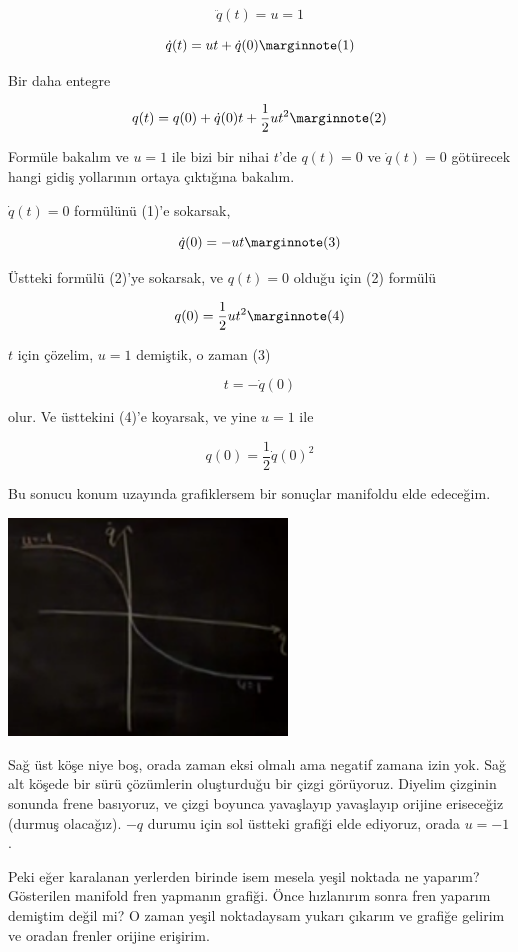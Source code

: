 \documentclass[12pt,fleqn]{article}\usepackage{../../common}
\begin{document}
$$ 
\ddot{q}(t) = u = 1
$$

$$ 
\dot{q}(t) = u t + \dot{q}(0) 
\mlabel{1}
$$

Bir daha entegre

$$ 
q(t) = q(0) + \dot{q}(0) t + \frac{1}{2} u t^2 
\mlabel{2}
$$

Formüle bakalım ve $u=1$ ile bizi bir nihai $t$'de $q(t)=0$ ve
$\dot{q}(t)=0$ götürecek hangi gidiş yollarının ortaya çıktığına bakalım. 

$\dot{q}(t)=0$ formülünü (1)'e sokarsak, 

$$
\dot{q}(0) = - u t 
\mlabel{3}
$$

Üstteki formülü (2)'ye sokarsak, ve $q(t)=0$ olduğu için (2) formülü

$$
q(0) = \frac{1}{2} ut^2 \mlabel{4}
$$

$t$ için çözelim, $u=1$ demiştik, o zaman (3)

$$
t = -\dot{q}(0)
$$

olur. Ve üsttekini (4)'e koyarsak, ve yine $u=1$ ile

$$
q(0) = \frac{1}{2} \dot{q}(0)^2
$$

Bu sonucu konum uzayında grafiklersem bir sonuçlar manifoldu elde edeceğim.

\includegraphics[width=20em]{phy_control_04.png}

Sağ üst köşe niye boş, orada zaman eksi olmalı ama negatif zamana izin
yok. Sağ alt köşede bir sürü çözümlerin oluşturduğu bir çizgi
görüyoruz. Diyelim çizginin sonunda frene basıyoruz, ve çizgi boyunca
yavaşlayıp yavaşlayıp orijine eriseceğiz (durmuş olacağız). $-q$ durumu
için sol üstteki grafiği elde ediyoruz, orada $u=-1$.

Peki eğer karalanan yerlerden birinde isem mesela yeşil noktada ne yaparım?
Gösterilen manifold fren yapmanın grafiği. Önce hızlanırım sonra fren
yaparım demiştim değil mi? O zaman yeşil noktadaysam yukarı çıkarım ve
grafiğe gelirim ve oradan frenler orijine erişirim. 
\end{document}
